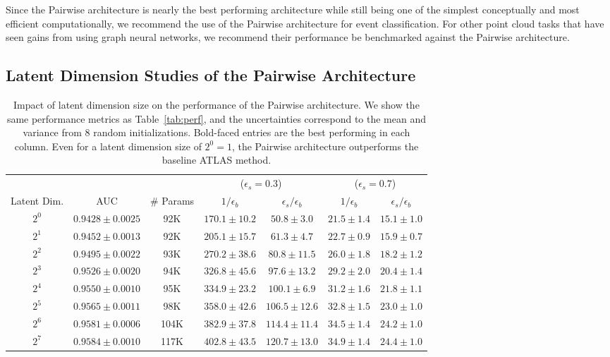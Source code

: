 \documentclass[aps,prd,twocolumn,superscriptaddress,floatfix,longbibliography,preprintnumbers,nofootinbib]{revtex4-1} %
\DeclareRobustCommand{\Tab}[1]{Table~\ref{tab:#1}}
\begin{document}
Since the Pairwise architecture is nearly the best performing architecture while still being one of the simplest conceptually and most efficient computationally, we recommend the use of the Pairwise architecture for event classification.
%
For other point cloud tasks that have seen gains from using graph neural networks, we recommend their performance be benchmarked against the Pairwise architecture.




\subsection{{Latent Dimension Studies of the Pairwise Architecture}}
\label{sec:lat}

\begin{table*}
  \caption{\label{tab:lat}
  Impact of latent dimension size on the performance of the Pairwise architecture.
  We show the same performance metrics as \Tab{perf}, and the uncertainties correspond to the mean and variance from 8 random initializations.  
  Bold-faced entries are the best performing in each column.
  Even for a latent dimension size of $2^0 = 1$, the Pairwise architecture outperforms the baseline ATLAS method. 
}
     \begin{ruledtabular}
     \begin{tabular}{c c c c c cc}
    & & & \multicolumn{2}{c}{($\epsilon_s=0.3$)} & \multicolumn{2}{c}{($\epsilon_s=0.7$)}\\
    \cmidrule(lr){4-5}\cmidrule{6-7}
       Latent Dim.&AUC&\# Params&$1/\epsilon_b$&$\epsilon_s / \epsilon_b$ &$1/\epsilon_b$&$\epsilon_s / \epsilon_b$ \\
       \hline

$2^0$ & $0.9428 \pm 0.0025$ & 92K & $170.1\pm 10.2$ & $50.8\pm 3.0$ & $21.5\pm 1.4$ & $15.1\pm 1.0$\\
$2^1$ & $0.9452 \pm 0.0013$ & 92K & $205.1\pm 15.7$ & $61.3\pm 4.7$ & $22.7\pm 0.9$ & $15.9\pm 0.7$\\
$2^2$ & $0.9495 \pm 0.0022$ & 93K & $270.2\pm 38.6$ & $80.8\pm 11.5$ & $26.0\pm 1.8$ & $18.2\pm 1.2$\\
$2^3$ & $0.9526 \pm 0.0020$ & 94K & $326.8\pm 45.6$ & $97.6\pm 13.2$ & $29.2\pm 2.0$ & $20.4\pm 1.4$\\
$2^4$ & $0.9550 \pm 0.0010$ & 95K & $334.9\pm 23.2$ & $100.1\pm 6.9$ & $31.2\pm 1.6$ & $21.8\pm 1.1$\\
$2^5$ & $0.9565 \pm 0.0011$ & 98K & $358.0\pm 42.6$ & $106.5\pm 12.6$ & $32.8\pm 1.5$ & $23.0\pm 1.0$\\
$2^6$ & $0.9581 \pm 0.0006$ & 104K & $382.9\pm 37.8$ & $114.4\pm 11.4$ & $34.5\pm 1.4$ & $24.2\pm 1.0$\\
$2^7$ & $\mathbf{0.9584 \pm 0.0010}$ & 117K & $\mathbf{402.8\pm 43.5}$ & $\mathbf{120.7\pm 13.0}$ & $\mathbf{34.9\pm 1.4}$ & $\mathbf{24.4\pm 1.0}$\\


\end{tabular}
\end{ruledtabular}
\end{table*}
\end{document}
